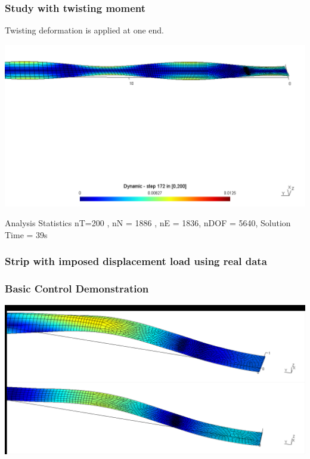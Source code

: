 \documentclass[9pt]{beamer}
\begin{document}
\begin{frame}\frametitle{Study with twisting moment}

Twisting deformation is applied at one end.

\begin{figure}[h!]
\centering

\end{figure}

\href{run:ParaStudy_onlydata/N2/3E7/Dynamic.mpg}{\includegraphics[width=1.0\textwidth,trim={0cm 15cm 0cm 1cm},clip]{ParaStudy_onlydata/twist.png}}


\begin{block}{Analysis Statistics}
nT=200 , nN = 1886 , nE = 1836, nDOF = 5640, Solution Time = 39s

\end{block}


\end{frame}





\begin{frame}\frametitle{Strip with imposed displacement load using real data }

\end{frame}



\begin{frame}
\frametitle{Basic Control Demonstration}
\href{run:images/control_demo.mpg}{\includegraphics[width=1.0\textwidth,trim={0.5cm 11cm 0.1cm 1cm},clip]{images/control_demo.png}}

\begin{figure}[h!]
\centering

\end{figure}

\end{frame}
\end{document}
